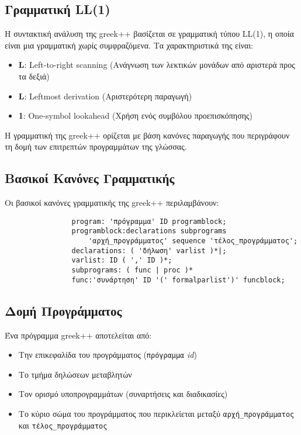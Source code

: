 \documentclass[12pt,a4paper]{article}
\begin{document}
        \subsection{Γραμματική LL(1)}
            Η συντακτική ανάλυση της greek++ βασίζεται σε γραμματική τύπου LL(1), η οποία είναι μια γραμματική χωρίς συμφραζόμενα. Τα χαρακτηριστικά της είναι:
            \begin{itemize}
                \item \textbf{L}: Left-to-right scanning (Ανάγνωση των λεκτικών μονάδων από αριστερά προς τα δεξιά)
                \item \textbf{L}: Leftmost derivation (Αριστερότερη παραγωγή)
                \item \textbf{1}: One-symbol lookahead (Χρήση ενός συμβόλου προεπισκόπησης)
            \end{itemize}

            Η γραμματική της greek++ ορίζεται με βάση κανόνες παραγωγής που περιγράφουν τη δομή των επιτρεπτών προγραμμάτων της γλώσσας.

        \subsection{Βασικοί Κανόνες Γραμματικής}
            Οι βασικοί κανόνες γραμματικής της greek++ περιλαμβάνουν:

            \begin{verbatim}
                program: 'πρόγραμμα' ID programblock;
                programblock:declarations subprograms
                    'αρχή_προγράμματος' sequence 'τέλος_προγράμματος';
                declarations: ( 'δήλωση' varlist )*|;
                varlist: ID ( ',' ID )*;
                subprograms: ( func | proc )*
                func:'συνάρτηση' ID '(' formalparlist')' funcblock;
            \end{verbatim}

        \subsection{Δομή Προγράμματος}
            Ένα πρόγραμμα greek++ αποτελείται από:
            \begin{itemize}
                \item Την επικεφαλίδα του προγράμματος (\texttt{πρόγραμμα} \textit{id})
                \item Το τμήμα δηλώσεων μεταβλητών
                \item Τον ορισμό υποπρογραμμάτων (συναρτήσεις και διαδικασίες)
                \item Το κύριο σώμα του προγράμματος που περικλείεται μεταξύ \texttt{αρχή\_προγράμματος} και \texttt{τέλος\_προγράμματος}
            \end{itemize}
\end{document}
